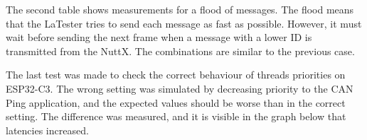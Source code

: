\documentclass{ctuthesis}
\begin{document}
 The second table shows measurements for a flood of messages. The flood means that the LaTester tries to send each message as fast as possible. However, it must wait before sending the next frame when a message with a lower ID is transmitted from the NuttX. The combinations are similar to the previous case.
 
\begin{table}[htb]
    \centering
    \caption{Measured NuttX latencies, messages sent a flood mode. 3200 messages were sent.}
    \label{tabulka:nuttx-flood}
\end{table}

 The last test was made to check the correct behaviour of threads priorities on ESP32-C3. The wrong setting was simulated by decreasing priority to the CAN Ping application, and the expected values should be worse than in the correct setting. The difference was measured, and it is visible in the graph below that latencies increased.
 
\end{document}
